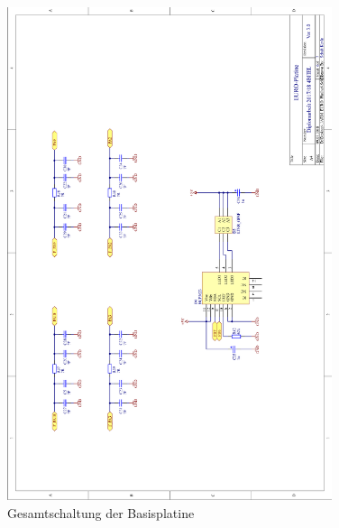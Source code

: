 \begin{figure}[H]\ContinuedFloat
    \centering
    \includegraphics[width=0.85\textwidth]{Schuh/Pictures/Basis-Schaltung6}
    \caption[Gesamtschaltung der Basisplatine]{Gesamtschaltung der \gls{Basisplatine}}
\end{figure}
